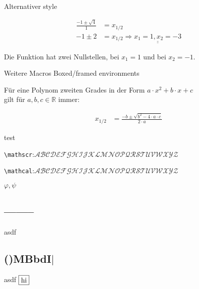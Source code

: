 \documentclass[
    ngerman,
    color=1b,
    load_common, %
    submission,
    submission,
    dark_mode,
    boxarc,
    fleqn,
]{rubos-tuda-template}
\begin{document}
\begin{task}[points=auto,solution=true]{Alternativer style}
\begin{subtask}[title={Irgend son Graph},points=2]
\begin{solution}
\begin{align*}
                    \frac{-1\pm \sqrt{4}}{1}                                        & =x_{1/2}                                                                                                                                                     \\
                    -1 \pm 2                                                        & =x_{1/2} \Rightarrow \underline{\underline{x_1                                       = 1, x_2=-3}}
                \end{align*}
                \begin{grayInfoBox}
                    \antwort Die Funktion hat zwei Nullstellen, bei $x_1=1$ und bei $x_2=-1$.
                \end{grayInfoBox}
            \end{solution}
        \end{subtask}
    \end{task}
    \clearpage
    \begin{task}[points=2,solution=true]{Weitere Macros}
        Boxed/framed environments
        \begin{definition}[Mitternachtsformel] Für eine Polynom zweiten Grades in der Form $a\cdot x^2+b\cdot x + c$ \\gilt für $a,b,c \in \mathbb{R}$ immer:%

            \begin{align}
                x_{1/2} & =\frac{-b\pm\sqrt{b^{2}-4\cdot a \cdot c}}{2\cdot a}
            \end{align}

        \end{definition}
        \begin{definition}
            test
        \end{definition}
        \verb+\mathscr+:$\mathscr{ABCDEFGHIJKLMNOPQRSTUVWXYZ}$

        \verb+\mathcal+:$\mathcal{ABCDEFGHIJKLMNOPQRSTUVWXYZ}$

        $\varphi, \psi$

        \begin{minipage}[t]{.5\textwidth-1pt}
            \subsection{--------} %
            asdf
        \end{minipage}\hspace{2pt}%
        \begin{minipage}[t]{.5\textwidth-1pt}
            \subsection{\texorpdfstring{()MBbdI$\vert$}{()MBbdI|}} %
            asdf $\vcenter{\hbox{\tikz{\node[draw]{hi};}}}$
        \end{minipage}
    \end{task}
\end{document}
